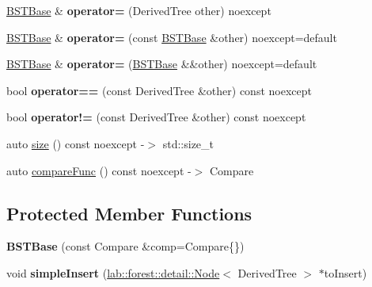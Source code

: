 \begin{DoxyCompactItemize}
\item 
\mbox{\label{classlab_1_1forest_1_1detail_1_1BSTBase_ac56cd574b026e98ddb2aeca457d5d898}} 
\hyperlink{classlab_1_1forest_1_1detail_1_1BSTBase}{B\+S\+T\+Base} \& {\bfseries operator=} (Derived\+Tree other) noexcept
\item 
\mbox{\label{classlab_1_1forest_1_1detail_1_1BSTBase_a7bb7f10ef641e7057949c00cf8cc812b}} 
\hyperlink{classlab_1_1forest_1_1detail_1_1BSTBase}{B\+S\+T\+Base} \& {\bfseries operator=} (const \hyperlink{classlab_1_1forest_1_1detail_1_1BSTBase}{B\+S\+T\+Base} \&other) noexcept=default
\item 
\mbox{\label{classlab_1_1forest_1_1detail_1_1BSTBase_ac578b147c53ab2f0a18a15756d94ac76}} 
\hyperlink{classlab_1_1forest_1_1detail_1_1BSTBase}{B\+S\+T\+Base} \& {\bfseries operator=} (\hyperlink{classlab_1_1forest_1_1detail_1_1BSTBase}{B\+S\+T\+Base} \&\&other) noexcept=default
\item 
\mbox{\label{classlab_1_1forest_1_1detail_1_1BSTBase_aaf5f2af7dd8862c7e2181eec6a767bfa}} 
bool {\bfseries operator==} (const Derived\+Tree \&other) const noexcept
\item 
\mbox{\label{classlab_1_1forest_1_1detail_1_1BSTBase_a48843ab8cae5c4246bddc895f634de53}} 
bool {\bfseries operator!=} (const Derived\+Tree \&other) const noexcept
\item 
auto \hyperlink{classlab_1_1forest_1_1detail_1_1BSTBase_a26625c36d62d907106f61a33f793777b}{size} () const noexcept -\/$>$ std\+::size\+\_\+t
\item 
auto \hyperlink{classlab_1_1forest_1_1detail_1_1BSTBase_a8986f7a9fd8ef965740f0fd1acd71dd3}{compare\+Func} () const noexcept -\/$>$ Compare
\end{DoxyCompactItemize}
\subsection*{Protected Member Functions}
\begin{DoxyCompactItemize}
\item 
\mbox{\label{classlab_1_1forest_1_1detail_1_1BSTBase_af77ccebd03c9e2fb80b462b0e231f1ae}} 
{\bfseries B\+S\+T\+Base} (const Compare \&comp=Compare\{\})
\item 
\mbox{\label{classlab_1_1forest_1_1detail_1_1BSTBase_a9691e34ec314b525967888ad09e8717a}} 
void {\bfseries simple\+Insert} (\hyperlink{structlab_1_1forest_1_1detail_1_1Node}{lab\+::forest\+::detail\+::\+Node}$<$ Derived\+Tree $>$ $\ast$to\+Insert)
\end{DoxyCompactItemize}
